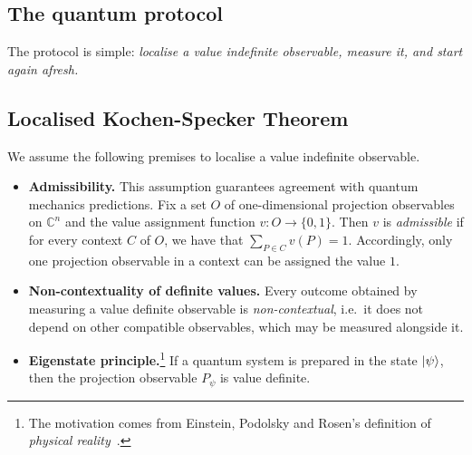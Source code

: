 \documentclass[l1pt]{elsarticle}
\begin{document}
{\color{black}
\subsection{The quantum protocol}

The protocol is simple: {\it localise a value indefinite {\color{black}observable},  measure it, and start again afresh.}
\subsection{Localised Kochen-Specker Theorem}

We assume the following  premises to localise a value indefinite {\color{black}observable}.

\begin{itemize}
\item {\bf Admissibility.} This assumption guarantees agreement with quantum mechanics predictions. Fix a set $O$  of one-dimensional projection observables on $\mathbb{C}^{n}$ and the value assignment function $v:O\rightarrow \{0,1\}$. Then $v$ is  {\it  admissible} if for  every context $C$ of $O$, we have that $\sum_{P\in C}v(P) = 1$. Accordingly,  only one projection observable in a context can be assigned the value $1$.



\item {\bf Non-contextuality of definite values.}  Every outcome obtained by
measuring a value definite observable
 is {\it  non-contextual}, i.e.\ it does not
depend on other compatible
 observables, which may be measured alongside it.
 \item{\bf Eigenstate principle.}\footnote{The motivation comes from Einstein, Podolsky and Rosen's definition of {\em physical reality}~\cite[p.~777]{epr}.}  If a quantum system is prepared in the
state $\ket{\psi}$, then the projection observable
$P_\psi$ is value definite.
\end{itemize}


}
\end{document}
